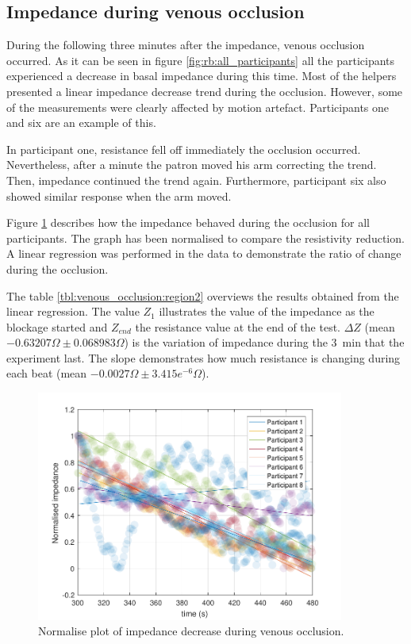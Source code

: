 \subsection{Impedance during venous occlusion}
\label{section5.1.2}
During the following three minutes after the impedance, venous occlusion occurred. As it can be seen in figure \ref{fig:rb:all_participants} all the participants experienced a decrease in basal impedance during this time. Most of the helpers presented a linear impedance decrease trend during the occlusion. However, some of the measurements were clearly affected by motion artefact. Participants one and six are an example of this. 

In participant one, resistance fell off immediately the occlusion occurred. Nevertheless, after a minute the patron moved his arm correcting the trend. Then, impedance continued the trend again. Furthermore,  participant six also showed similar response when the arm moved. 

Figure \ref{fig:normalise:venous_occlusion} describes how the impedance behaved during the occlusion for all participants. The graph has been normalised to compare the resistivity reduction.  A linear regression was performed in the data to demonstrate the ratio of change during the occlusion.  

The table \ref{tbl:venous_occlusion:region2} overviews the results obtained from the linear regression. The value $Z_1$ illustrates the value of the impedance as the blockage started and $Z_{end}$ the resistance value at the end of the test.  $\Delta Z$ (mean $-0.63207 \Omega \pm0.068983\Omega$) is the variation of impedance during the \SI{3}{\minute} that the experiment last.  The slope demonstrates how much resistance is changing during each beat  (mean $-0.0027\Omega\pm3.415e^{-6}\Omega$). 

\begin{figure}
	\centering
	\includegraphics[width=0.9\textwidth,height=0.9\textheight,keepaspectratio]{figure3}    
	\caption{Normalise plot of impedance decrease during venous occlusion.}
	\label{fig:normalise:venous_occlusion}
\end{figure}

